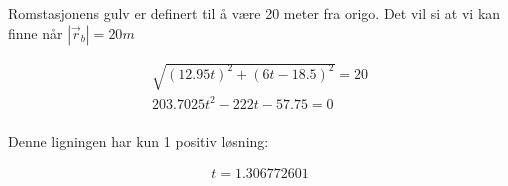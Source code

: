 \subsubsection{}

Romstasjonens gulv er definert til å være 20 meter fra origo. Det vil si at vi kan finne når $|\vec{r}_b| = 20m$

\begin{align}
\sqrt{(12.95 t)^2 + (6 t - 18.5)^2} = 20 \\[1em]
203.7025 t^2 - 222 t - 57.75 = 0 \\[1em]
\end{align}

Denne ligningen har kun 1 positiv løsning:

\begin{align}
t = 1.306772601 \\[1em]
\end{align}

\begin{figure}[H]
\centering

\caption{}
\end{figure}

\newpage




\newpage